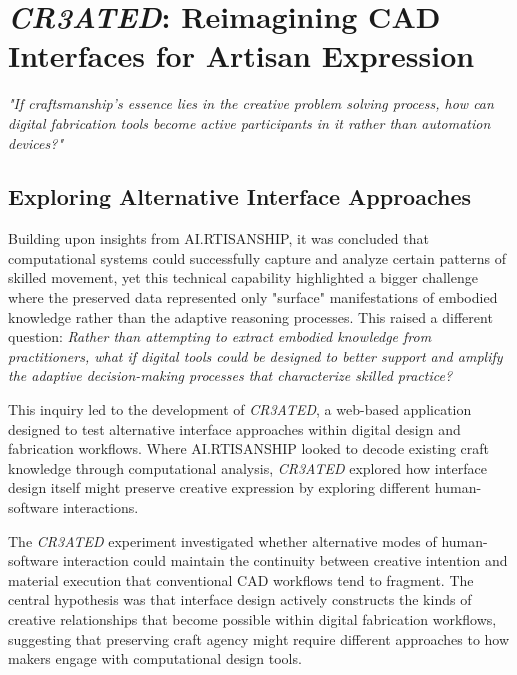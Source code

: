 \section{\textit{CR3ATED}: Reimagining CAD Interfaces for Artisan Expression}
\textit{"If craftsmanship's essence lies in the creative problem solving process, how can digital fabrication tools become active participants in it rather than automation devices?"}

\vspace{0.5cm}

\subsection{Exploring Alternative Interface Approaches}

Building upon insights from AI.RTISANSHIP, it was concluded that computational systems could successfully capture and analyze certain patterns of skilled movement, yet this technical capability highlighted a bigger challenge where the preserved data represented only "surface" manifestations of embodied knowledge rather than the adaptive reasoning processes. This raised a different question: \textit{Rather than attempting to extract embodied knowledge from practitioners, what if digital tools could be designed to better support and amplify the adaptive decision-making processes that characterize skilled practice?}

\vspace{0.5cm}

This inquiry led to the development of \textit{CR3ATED}, a web-based application designed to test alternative interface approaches within digital design and fabrication workflows. Where AI.RTISANSHIP looked to decode existing craft knowledge through computational analysis, \textit{CR3ATED} explored how interface design itself might preserve creative expression by exploring different human-software interactions.

\vspace{0.5cm}

The \textit{CR3ATED} experiment investigated whether alternative modes of human-software interaction could maintain the continuity between creative intention and material execution that conventional CAD workflows tend to fragment. The central hypothesis was that interface design actively constructs the kinds of creative relationships that become possible within digital fabrication workflows, suggesting that preserving craft agency might require different approaches to how makers engage with computational design tools.

